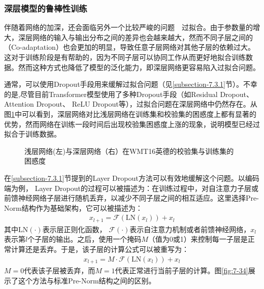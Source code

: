
\subsubsection{深层模型的鲁棒性训练}

\parinterval 伴随着网络的加深，还会面临另外一个比较严峻的问题\ \dash \ 过拟合。由于参数量的增大，深层网络的输入与输出分布之间的差异也会越来越大，然而不同子层之间的{\small{}}（Co-adaptation）也会更加的明显，导致任意子层网络对其他子层的依赖过大。这对于训练阶段是有帮助的，因为不同子层可以协同工作从而更好地拟合训练数据。然而这种方式也降低了模型的泛化能力，即深层网络更容易陷入过拟合问题。

\parinterval 通常，可以使用Dropout手段用来缓解过拟合问题（见\ref{subsection-7.3.1}节）。不幸的是,尽管目前Transformer模型使用了多种Dropout手段（如Residual Dropout、Attention Dropout、 ReLU Dropout等），过拟合问题在深层网络中仍然存在。从图\ref{fig:7-33}中可以看到，深层网络对比浅层网络在训练集和校验集的困惑度上都有显著的优势，然而网络在训练一段时间后出现校验集困惑度上涨的现象，说明模型已经过拟合于训练数据。

\begin{figure}[htp]
\centering

\caption{浅层网络(左)与深层网络（右）在WMT16英德的校验集与训练集的困惑度}
\label{fig:7-33}
\end{figure}

\parinterval 在\ref{subsection-7.3.1}节提到的Layer Dropout方法可以有效地缓解这个问题。以编码端为例， Layer Dropout的过程可以被描述为：在训练过程中，对自注意力子层或前馈神经网络子层进行随机丢弃，以减少不同子层之间的相互适应。这里选择Pre-Norm结构作为基础架构，它可以被描述为：
\begin{eqnarray}
x_{l+1}=\mathcal{F}(\textrm{LN}(x_l))+x_l
\label{eq:7-24}
\end{eqnarray}
其中$\textrm{LN}( \cdot )$表示层正则化函数， $\mathcal{F}( \cdot )$表示自注意力机制或者前馈神经网络，$x_l$表示第$l$个子层的输出。之后，使用一个掩码$M$（值为0或1）来控制每一子层是正常计算还是丢弃。于是，该子层的计算公式可以被重写为：
\begin{eqnarray}
x_{l+1}=M \cdot \mathcal{F}(\textrm{LN}(x_l))+x_l
\label{eq:7-25}
\end{eqnarray}
$M=0$代表该子层被丢弃，而$M=1$代表正常进行当前子层的计算。图\ref{fig:7-34}展示了这个方法与标准Pre-Norm结构之间的区别。

